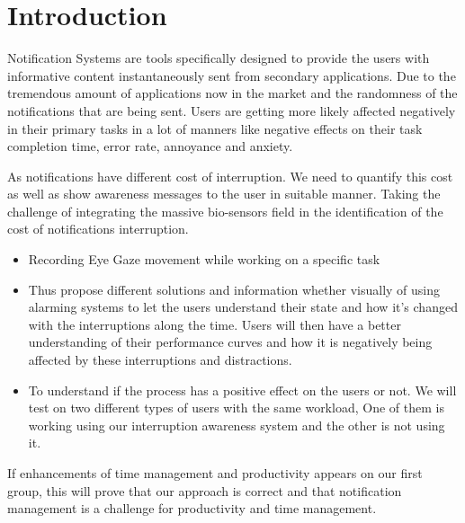 \chapter{Introduction}
\label{chap:intro}

Notification Systems are tools specifically designed to provide the users with informative content instantaneously sent from secondary applications. Due to the tremendous amount of applications now in the market and the randomness of the notifications that are being sent. Users are getting more likely affected negatively in their primary tasks in a lot of manners like negative effects on their task completion time, error rate, annoyance and anxiety.

As notifications have different cost of interruption. We need to quantify this cost as well as show awareness messages to the user in suitable manner. Taking the challenge of integrating the massive bio-sensors field in the identification of the cost of notifications interruption.

\begin{itemize}
  \item Recording Eye Gaze movement while working on a specific task
  \item Thus propose different solutions and information whether visually of using alarming systems to let the users understand their state and how it's changed with the interruptions along the time. Users will then have a better understanding of their performance curves and how it is negatively being affected by these interruptions and distractions.
  \item To understand if the process has a positive effect on the users or not. We will test on two different types of users with the same workload, One of them is working using our interruption awareness system and the other is not using it.
\end{itemize}

If enhancements of time management and productivity appears on our first group, this will prove that our approach is correct and that notification management is a challenge for productivity and time management.